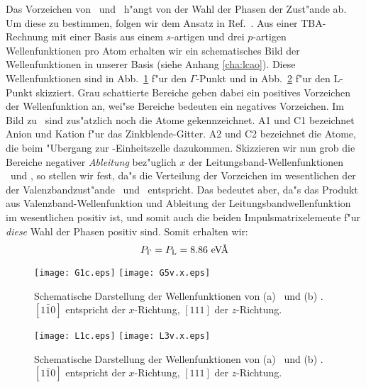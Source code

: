 Das Vorzeichen von \PG\ und \PL\ h"angt von der Wahl der Phasen der Zust"ande
ab. Um diese zu bestimmen, folgen wir dem Ansatz in Ref.~\cite{ccf:88}. Aus
einer TBA-Rechnung mit einer Basis aus einem $s$-artigen und drei
$p$-artigen Wellenfunktionen pro Atom erhalten wir ein schematisches Bild der
Wellenfunktionen in unserer Basis (siehe Anhang \ref{cha:lcao}). Diese Wellenfunktionen sind in
Abb.~\ref{fig:wfkt-G} f"ur den $\Gamma$-Punkt und in Abb.~\ref{fig:wfkt-L}
f"ur den L-Punkt skizziert. Grau schattierte Bereiche geben dabei ein positives
Vorzeichen der Wellenfunktion an, wei"se Bereiche bedeuten ein negatives
Vorzeichen. Im Bild zu \GCB\ sind zus"atzlich noch die Atome gekennzeichnet.
A1 und C1 bezeichnet Anion und Kation f"ur das Zinkblende-Gitter. A2 und C2
bezeichnet die Atome, die beim "Ubergang zur \CuPt-Einheitszelle dazukommen.
Skizzieren wir nun grob die Bereiche negativer \emph{Ableitung} bez"uglich $x$
der Leitungsband-Wellenfunktionen \GCB\ und \LCB, so stellen wir fest, da"s
die Verteilung der Vorzeichen im wesentlichen der der Valenzbandzust"ande
\GVBx\ und \LVBx\ entspricht. Das bedeutet aber, da"s das Produkt aus
Valenzband-Wellenfunktion und Ableitung der Leitungsbandwellenfunktion im
wesentlichen positiv ist, und somit auch die beiden Impulsmatrixelemente f"ur
\emph{diese} Wahl der Phasen positiv sind. Somit erhalten wir:
%
\begin{displaymath}
  P_{\Gamma} = P_{\text{L}} = 8.86\text{~eV\AA}
\end{displaymath}
%
 
\begin{figure}
  \centering
  \texttt{[image: G1c.eps]}\raisebox{4cm}{(a)}
  \vspace{2ex}
  \texttt{[image: G5v.x.eps]}\raisebox{4cm}{(b)}
  \caption{Schematische Darstellung der Wellenfunktionen von (a) \GCB\ und (b)
  \GVBx. $[1 \bar 1 0]$ entspricht der $x$-Richtung, $[111]$ der 
  $z$-Richtung. }
  \label{fig:wfkt-G}
\end{figure}

\begin{figure}
  \centering
  \texttt{[image: L1c.eps]}\raisebox{4cm}{(a)}
  \vspace{2ex}
  \texttt{[image: L3v.x.eps]}\raisebox{4cm}{(b)}
  \caption{Schematische Darstellung der Wellenfunktionen von (a) \LCB\ und (b)
  \LVBx. $[1 \bar 1 0]$ entspricht der $x$-Richtung, $[111]$ der
  $z$-Richtung.}
  \label{fig:wfkt-L}
\end{figure}

